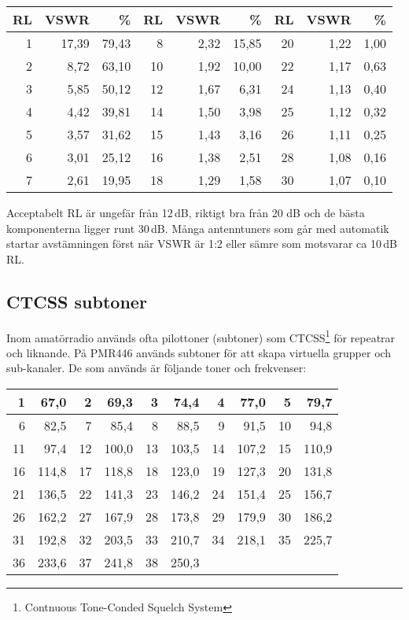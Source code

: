 \begin{longtable}{rrr|rrr|rrr}
	\textbf{RL} & \textbf{VSWR} & \textbf{\%} & \textbf{RL} & \textbf{VSWR} & \textbf{\%} & \textbf{RL} & \textbf{VSWR} & \textbf{\%} \\ \hline 	\endhead
	          1 &         17,39 &       79,43 &           8 &          2,32 &       15,85 &          20 &          1,22 &        1,00 \\
	          2 &          8,72 &       63,10 &          10 &          1,92 &       10,00 &          22 &          1,17 &        0,63 \\
	          3 &          5,85 &       50,12 &          12 &          1,67 &        6,31 &          24 &          1,13 &        0,40 \\
	          4 &          4,42 &       39,81 &          14 &          1,50 &        3,98 &          25 &          1,12 &        0,32 \\
	          5 &          3,57 &       31,62 &          15 &          1,43 &        3,16 &          26 &          1,11 &        0,25 \\
	          6 &          3,01 &       25,12 &          16 &          1,38 &        2,51 &          28 &          1,08 &        0,16 \\
	          7 &          2,61 &       19,95 &          18 &          1,29 &        1,58 &          30 &          1,07 &        0,10
\end{longtable}

Acceptabelt RL är ungefär från 12\,dB, riktigt bra från 20 dB och de bästa komponenterna ligger runt 30\,dB. Många antenntuners som går med automatik startar avstämningen först när VSWR är 1:2 eller sämre som motsvarar ca 10\,dB\,RL.

\subsection{CTCSS subtoner}

Inom amatörradio används ofta pilottoner (subtoner) som CTCSS\footnote{Contnuous Tone-Conded Squelch System} för repeatrar och liknande. På PMR446 används subtoner för att skapa virtuella grupper och sub-kanaler. De som används är följande toner och frekvenser:

\begin{tabular}{rr|rr|rr|rr|rr}
	 1 &  67,0 &  2 &  69,3 &  3 &  74,4 &  4 &  77,0 &  5 &  79,7 \\ \hline
	 6 &  82,5 &  7 &  85,4 &  8 &  88,5 &  9 &  91,5 & 10 &  94,8 \\ \hline
	11 &  97,4 & 12 & 100,0 & 13 & 103,5 & 14 & 107,2 & 15 & 110,9 \\ \hline
	16 & 114,8 & 17 & 118,8 & 18 & 123,0 & 19 & 127,3 & 20 & 131,8 \\ \hline
	21 & 136,5 & 22 & 141,3 & 23 & 146,2 & 24 & 151,4 & 25 & 156,7 \\ \hline
	26 & 162,2 & 27 & 167,9 & 28 & 173,8 & 29 & 179,9 & 30 & 186,2 \\ \hline
	31 & 192,8 & 32 & 203,5 & 33 & 210,7 & 34 & 218,1 & 35 & 225,7 \\ \hline
	36 & 233,6 & 37 & 241,8 & 38 & 250,3 &    &       &    &
\end{tabular}

